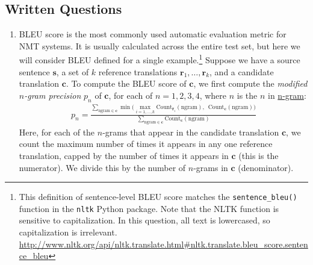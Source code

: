 \documentclass{assignment format}
\begin{document}
\subsection{Written Questions}
\begin{enumerate}[label=(\alph*)]
\item BLEU score is the most commonly used automatic evaluation metric for NMT systems. It is usually calculated across the entire test set, but here we will consider BLEU defined for a single example.\footnote{This definition of sentence-level BLEU score matches the \texttt{sentence\_bleu()} function in the \texttt{nltk} Python package. Note that the NLTK function is sensitive to capitalization. In this question, all text is lowercased, so capitalization is irrelevant. \\ \url{http://www.nltk.org/api/nltk.translate.html\#nltk.translate.bleu_score.sentence_bleu}
    }
    Suppose we have a source sentence $\mathbf{s}$, a set of $k$ reference translations $\mathbf{r}_1,\dots,\mathbf{r}_k$, and a candidate translation $\mathbf{c}$. To compute the BLEU score of $\mathbf{c}$, we first compute the \textit{modified $n$-gram precision} $p_n$ of $\mathbf{c}$, for each of $n=1,2,3,4$, where $n$ is the $n$ in \href{https://en.wikipedia.org/wiki/N-gram}{n-gram}:
    \begin{align}
        p_n = \frac{ \displaystyle \sum_{\text{ngram} \in \mathbf{c}} \min \bigg( \max_{i=1,\dots,k} \text{Count}_{\mathbf{r}_i}(\text{ngram}), \enspace \text{Count}_{\mathbf{c}}(\text{ngram}) \bigg) }{\displaystyle \sum_{\text{ngram}\in \mathbf{c}} \text{Count}_{\mathbf{c}}(\text{ngram})}
    \end{align}
     Here, for each of the $n$-grams that appear in the candidate translation $\mathbf{c}$, we count the maximum number of times it appears in any one reference translation, capped by the number of times it appears in $\mathbf{c}$ (this is the numerator). We divide this by the number of $n$-grams in $\mathbf{c}$ (denominator). \newline 


\end{enumerate}
\end{document}
